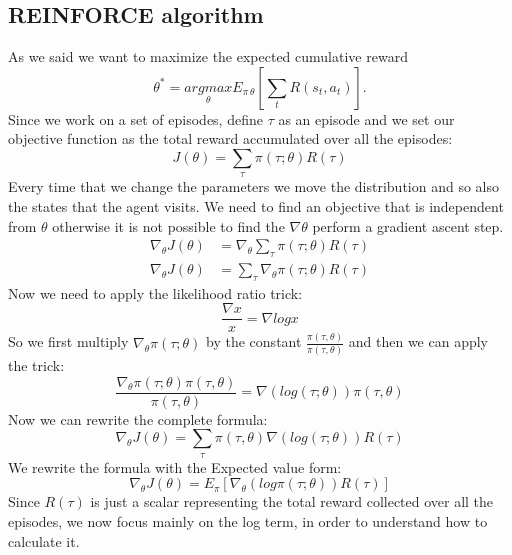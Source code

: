 \subsection{REINFORCE algorithm}
As we said we want to maximize the expected cumulative reward 
\begin{equation*}
\theta^* = \underset{\theta}{argmax} E_{\pi\,\theta} \left[ \sum_t R(s_t,a_t)\right].
\end{equation*}
Since we work on a set of episodes, define $\tau$ as an episode and we set our objective function as the total reward accumulated over all the episodes:
\begin{equation*}
J(\theta) = \sum_\tau \pi(\tau;\theta)R(\tau)
\end{equation*}
Every time that we change the parameters we move the distribution and so also the states that the agent visits.
We need to find an objective that is independent from $\theta$ otherwise it is not possible to find the $\nabla \theta$ perform a gradient ascent step.
\begin{align*}
\nabla_\theta J(\theta) &= \nabla_\theta\sum_\tau \pi (\tau;\theta)R(\tau)\\
\nabla_\theta J(\theta) &= \sum_\tau \nabla_\theta\pi (\tau;\theta)R(\tau)
\end{align*}
Now we need to apply the likelihood ratio trick:
\begin{equation*}
\frac{\nabla x}{x} = \nabla log x
\end{equation*}
So we first multiply  $\nabla_\theta\pi (\tau;\theta)$ by the constant $\frac{\pi(\tau,\theta)}{\pi(\tau,\theta)}$ and then we can apply the trick:
\begin{equation*}
\frac{\nabla_\theta\pi (\tau;\theta)\pi(\tau,\theta)}{\pi(\tau,\theta)} = \nabla(log (\tau;\theta))\pi(\tau,\theta)
\end{equation*}
Now we can rewrite the complete formula:
\begin{equation*}
\nabla_\theta J(\theta) = \sum_\tau  \pi(\tau,\theta) \nabla(log (\tau;\theta))  R(\tau)
\end{equation*}
We rewrite the formula with the Expected value form:
\begin{equation}
\label{partial_objective_reinforce}
\nabla_\theta J(\theta) = E_\pi \left[ \nabla_\theta (log\pi (\tau;\theta))  R(\tau)\right]
\end{equation}
Since $R(\tau)$ is just a scalar representing the total reward collected over all the episodes, we now focus mainly on the log term, in order to understand how to calculate it.
